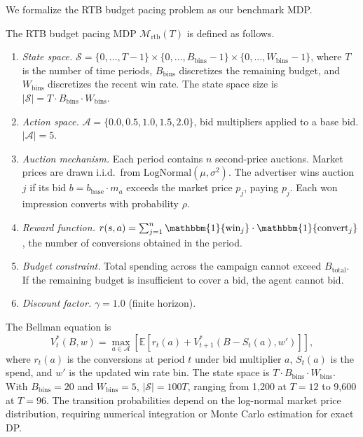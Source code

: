 We formalize the RTB budget pacing problem as our benchmark MDP.

\begin{definition}
\label{def:rtb_mdp}
The RTB budget pacing MDP $\mathcal{M}_{\mathrm{rtb}}(T)$ is defined as follows.
\begin{enumerate}
    \item \emph{State space.} $\mathcal{S} = \{0, \ldots, T-1\} \times \{0, \ldots, B_{\mathrm{bins}}-1\} \times \{0, \ldots, W_{\mathrm{bins}}-1\}$, where $T$ is the number of time periods, $B_{\mathrm{bins}}$ discretizes the remaining budget, and $W_{\mathrm{bins}}$ discretizes the recent win rate. The state space size is $|\mathcal{S}| = T \cdot B_{\mathrm{bins}} \cdot W_{\mathrm{bins}}$.
    \item \emph{Action space.} $\mathcal{A} = \{0.0, 0.5, 1.0, 1.5, 2.0\}$, bid multipliers applied to a base bid. $|\mathcal{A}| = 5$.
    \item \emph{Auction mechanism.} Each period contains $n$ second-price auctions. Market prices are drawn i.i.d.\ from $\mathrm{LogNormal}(\mu, \sigma^2)$. The advertiser wins auction $j$ if its bid $b = b_{\mathrm{base}} \cdot m_a$ exceeds the market price $p_j$, paying $p_j$. Each won impression converts with probability $\rho$.
    \item \emph{Reward function.} $r(s, a) = \sum_{j=1}^{n} \mathbbm{1}\{\text{win}_j\} \cdot \mathbbm{1}\{\text{convert}_j\}$, the number of conversions obtained in the period.
    \item \emph{Budget constraint.} Total spending across the campaign cannot exceed $B_{\mathrm{total}}$. If the remaining budget is insufficient to cover a bid, the agent cannot bid.
    \item \emph{Discount factor.} $\gamma = 1.0$ (finite horizon).
\end{enumerate}
\end{definition}

The Bellman equation is
\begin{equation}
\label{eq:rtb_bellman}
V^*_t(B, w) = \max_{a \in \mathcal{A}} \left[ \mathbb{E}\left[ r_t(a) + V^*_{t+1}(B - S_t(a), w') \right] \right],
\end{equation}
where $r_t(a)$ is the conversions at period $t$ under bid multiplier $a$, $S_t(a)$ is the spend, and $w'$ is the updated win rate bin. The state space is $T \cdot B_{\mathrm{bins}} \cdot W_{\mathrm{bins}}$. With $B_{\mathrm{bins}} = 20$ and $W_{\mathrm{bins}} = 5$, $|\mathcal{S}| = 100T$, ranging from 1,200 at $T = 12$ to 9,600 at $T = 96$. The transition probabilities depend on the log-normal market price distribution, requiring numerical integration or Monte Carlo estimation for exact DP.

